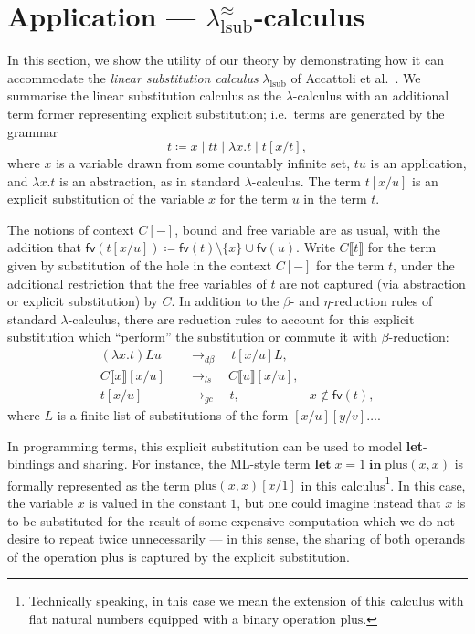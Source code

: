 \section{Application --- $\lambda^\approx_{\text{lsub}}$-calculus}
\label{sec:application}

In this section, we show the utility of our theory by demonstrating how it can accommodate the \emph{linear substitution calculus} $\lambda_{\text{lsub}}$ of Accattoli et al.~\cite[§ 2]{accattoli2014nonstandard}.
We summarise the linear substitution calculus as the $\lambda$-calculus with an additional term former representing explicit substitution; i.e.\ terms are generated by the grammar
\[
	t \coloneqq x \mid t t \mid \lambda x. t \mid t [x/t],
\]
where $x$ is a variable drawn from some countably infinite set, $t u$ is an application, and $\lambda x. t$ is an abstraction, as in standard $\lambda$-calculus.
The term $t [x / u]$ is an explicit substitution of the variable $x$ for the term $u$ in the term $t$.

The notions of context $C[-]$, bound and free variable are as usual, with the addition that $\textsf{fv} (t [x/u]) \coloneq \textsf{fv} (t) \setminus \{ x \} \cup \textsf{fv} (u)$.
Write $C \llbracket t \rrbracket$ for the term given by substitution of the hole in the context $C[-]$ for the term $t$, under the additional restriction that the free variables of $t$ are not captured (via abstraction or explicit substitution) by $C$.
In addition to the $\beta$- and $\eta$-reduction rules of standard $\lambda$-calculus, there are reduction rules to account for this explicit substitution which \enquote{perform} the substitution or commute it with $\beta$-reduction:
\begin{align*}
	(\lambda x. t) L u              \quad & \to_{d\beta} \quad t[x/u] L,                                                \\
	C \llbracket x \rrbracket [x/u] \quad & \to_{ls} \quad C \llbracket u \rrbracket [x/u],                             \\
	t [x/u]                         \quad & \to_{gc} \quad t,                               & x \notin \textsf{fv} (t),
\end{align*}
where $L$ is a finite list of substitutions of the form $[x/u] [y/v] \ldots$.

In programming terms, this explicit substitution can be used to model \textbf{let}-bindings and sharing.
For instance, the ML-style term $\textbf{let} \; x = 1 \; \textbf{in} \; \text{plus} (x, x)$ is formally represented as the term $\text{plus} (x, x) [x / 1]$ in this calculus\footnote{Technically speaking, in this case we mean the extension of this calculus with flat natural numbers equipped with a binary operation $\text{plus}$.}.
In this case, the variable $x$ is valued in the constant $1$, but one could imagine instead that $x$ is to be substituted for the result of some expensive computation which we do not desire to repeat twice unnecessarily --- in this sense, the sharing of both operands of the operation $\text{plus}$ is captured by the explicit substitution.

